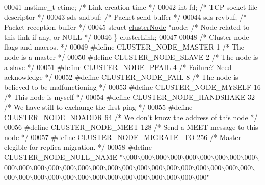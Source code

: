 \begin{DoxyCode}
00041     mstime\_t ctime;             \textcolor{comment}{/* Link creation time */}
00042     \textcolor{keywordtype}{int} fd;                     \textcolor{comment}{/* TCP socket file descriptor */}
00043     sds sndbuf;                 \textcolor{comment}{/* Packet send buffer */}
00044     sds rcvbuf;                 \textcolor{comment}{/* Packet reception buffer */}
00045     \textcolor{keyword}{struct} \hyperlink{structclusterNode}{clusterNode} *node;   \textcolor{comment}{/* Node related to this link if any, or NULL */}
00046 \} clusterLink;
00047 
00048 \textcolor{comment}{/* Cluster node flags and macros. */}
00049 \textcolor{preprocessor}{#}\textcolor{preprocessor}{define} \textcolor{preprocessor}{CLUSTER\_NODE\_MASTER} 1     \textcolor{comment}{/* The node is a master */}
00050 \textcolor{preprocessor}{#}\textcolor{preprocessor}{define} \textcolor{preprocessor}{CLUSTER\_NODE\_SLAVE} 2      \textcolor{comment}{/* The node is a slave */}
00051 \textcolor{preprocessor}{#}\textcolor{preprocessor}{define} \textcolor{preprocessor}{CLUSTER\_NODE\_PFAIL} 4      \textcolor{comment}{/* Failure? Need acknowledge */}
00052 \textcolor{preprocessor}{#}\textcolor{preprocessor}{define} \textcolor{preprocessor}{CLUSTER\_NODE\_FAIL} 8       \textcolor{comment}{/* The node is believed to be malfunctioning */}
00053 \textcolor{preprocessor}{#}\textcolor{preprocessor}{define} \textcolor{preprocessor}{CLUSTER\_NODE\_MYSELF} 16    \textcolor{comment}{/* This node is myself */}
00054 \textcolor{preprocessor}{#}\textcolor{preprocessor}{define} \textcolor{preprocessor}{CLUSTER\_NODE\_HANDSHAKE} 32 \textcolor{comment}{/* We have still to exchange the first ping */}
00055 \textcolor{preprocessor}{#}\textcolor{preprocessor}{define} \textcolor{preprocessor}{CLUSTER\_NODE\_NOADDR}   64  \textcolor{comment}{/* We don't know the address of this node */}
00056 \textcolor{preprocessor}{#}\textcolor{preprocessor}{define} \textcolor{preprocessor}{CLUSTER\_NODE\_MEET} 128     \textcolor{comment}{/* Send a MEET message to this node */}
00057 \textcolor{preprocessor}{#}\textcolor{preprocessor}{define} \textcolor{preprocessor}{CLUSTER\_NODE\_MIGRATE\_TO} 256 \textcolor{comment}{/* Master elegible for replica migration. */}
00058 \textcolor{preprocessor}{#}\textcolor{preprocessor}{define} \textcolor{preprocessor}{CLUSTER\_NODE\_NULL\_NAME} \textcolor{stringliteral}{
      "\(\backslash\)000\(\backslash\)000\(\backslash\)000\(\backslash\)000\(\backslash\)000\(\backslash\)000\(\backslash\)000\(\backslash\)000\(\backslash\)000\(\backslash\)000\(\backslash\)000\(\backslash\)000\(\backslash\)000\(\backslash\)000\(\backslash\)000\(\backslash\)000\(\backslash\)000\(\backslash\)000\(\backslash\)000\(\backslash\)000\(\backslash\)000\(\backslash\)000\(\backslash\)000\(\backslash\)000\(\backslash\)000\(\backslash\)000\(\backslash\)000\(\backslash\)000\(\backslash\)000\(\backslash\)000\(\backslash\)000\(\backslash\)000\(\backslash\)000\(\backslash\)000\(\backslash\)000\(\backslash\)000\(\backslash\)000\(\backslash\)000\(\backslash\)000\(\backslash\)000"}

\end{DoxyCode}
